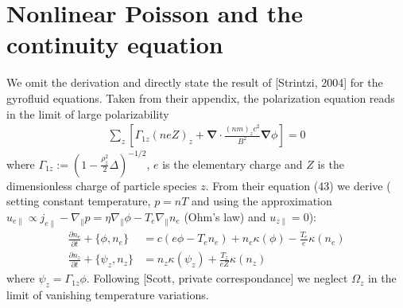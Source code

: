 \documentclass[a4paper,12pt]{scrartcl}
\renewcommand{\vec}[1]{{\mathbf{#1}}}
\begin{document}
\section{Nonlinear Poisson and the continuity equation}
We omit the derivation and directly state the result of [Strintzi, 2004] for 
the gyrofluid equations. Taken
from their appendix, the polarization equation reads in the limit
of large polarizability
\begin{align}
    \sum_z\left[ \Gamma_{1z} (neZ)_z + 
    \vec \nabla \cdot \frac{(nm)_zc^2}{B^2}\vec\nabla \phi\right] = 0 
    \label{eq:poisson}
\end{align}
where $\Gamma_{1z} := \left( 1-\frac{\rho_z^2}{2}\Delta \right)^{-1/2}$,
$e$ is the elementary charge and $Z$ is the dimensionless charge of particle
species $z$.
From their equation (43)  we derive ( setting constant temperature, $p = nT$ 
and using the approximation  
$u_{e\parallel} \propto j_{e\parallel} - \nabla_\parallel p 
        = \eta \nabla_\parallel\phi - T_e\nabla_\parallel n_e$
(Ohm's law)
and $u_{z\parallel} =0$):
\begin{subequations}
\begin{align}
    \frac{\partial n_e}{\partial t} + \{\phi, n_e\} &= c(e \phi - T_e n_e) + n_e\kappa(\phi) -
    \frac{T_e}{e}\kappa(n_e)  \\
    \frac{\partial n_z}{\partial t} + \{\psi_z, n_z\} &= n_z\kappa(\psi_z) +
    \frac{T_z}{eZ}\kappa(n_z) 
    \label{}
\end{align}
\end{subequations}
where $\psi_z = \Gamma_{1z} \phi$. Following [Scott, private correspondance] we 
 neglect $\Omega_z$ in the limit of vanishing temperature variations.
\end{document}
